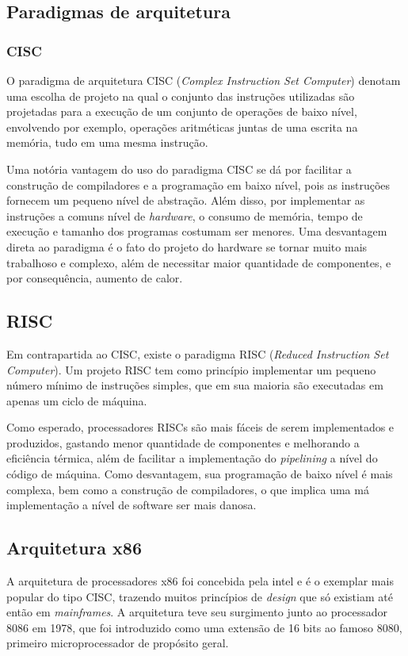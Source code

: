 \documentclass{article}
\begin{document}
\subsection{Paradigmas de arquitetura}

\subsubsection{CISC}
O paradigma de arquitetura CISC (\textit{Complex Instruction Set Computer})
denotam uma escolha de projeto na qual o conjunto das instruções utilizadas são
projetadas para a execução de um conjunto de operações de baixo nível,
envolvendo por exemplo, operações aritméticas juntas de uma escrita na memória,
tudo em uma mesma instrução.

Uma notória vantagem do uso do paradigma CISC se dá por facilitar a construção
de compiladores e a programação em baixo nível, pois as instruções fornecem um
pequeno nível de abstração. Além disso, por implementar as instruções a comuns
nível de \textit{hardware}, o consumo de memória, tempo de execução e tamanho dos
programas costumam ser menores. Uma desvantagem direta ao paradigma é o fato do
projeto do hardware se tornar muito mais trabalhoso e complexo, além de
necessitar maior quantidade de componentes, e por consequência, aumento de
calor.

\subsection{RISC}
Em contrapartida ao CISC, existe o paradigma RISC (\textit{Reduced Instruction
Set Computer}). Um projeto RISC tem como princípio implementar um pequeno número
mínimo de instruções simples, que em sua maioria são executadas em apenas um
ciclo de máquina.

Como esperado, processadores RISCs são mais fáceis de serem implementados e
produzidos, gastando menor quantidade de componentes e melhorando a eficiência
térmica, além de facilitar a implementação do \textit{pipelining} a nível do
código de máquina. Como desvantagem, sua programação de baixo nível é mais
complexa, bem como a construção de compiladores, o que implica uma má
implementação a nível de software ser mais danosa.

\subsection{Arquitetura x86} 
A arquitetura de processadores x86 foi concebida pela intel e é o exemplar mais
popular do tipo CISC, trazendo muitos princípios de \textit{design} que só
existiam até então em \textit{mainframes}. A arquitetura teve seu surgimento
junto ao processador 8086 em 1978, que foi introduzido como uma extensão de 16
bits ao famoso 8080, primeiro microprocessador de propósito geral.
\end{document}
